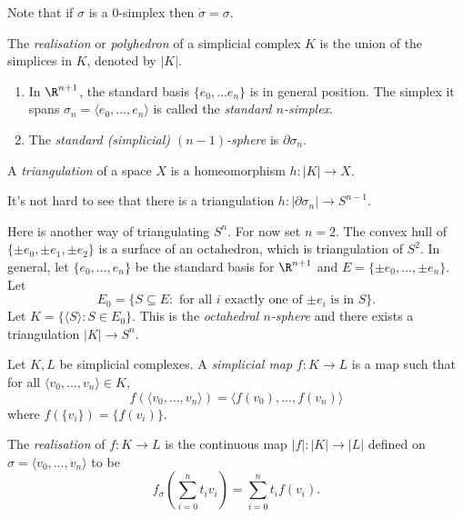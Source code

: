 \documentclass[a4paper]{article}
\renewcommand{\b}{\partial} %
\newcommand{\interior}{\mathring} %
\begin{document}
Note that if \(\sigma\) is a \(0\)-simplex then \(\interior \sigma = \sigma\).

\begin{definition}
  The \emph{realisation} or \emph{polyhedron} of a simplicial complex \(K\) is the union of the simplices in \(K\), denoted by \(|K|\).
\end{definition}

\begin{eg}\leavevmode
  \begin{enumerate}
  \item In \(\R^{n + 1}\), the standard basis \(\{e_0, \dots e_n\}\) is in general position. The simplex it spans \(\sigma_n = \langle e_0, \dots, e_n\rangle\) is called the \emph{standard \(n\)-simplex}.
  \item The \emph{standard (simplicial) \((n - 1)\)-sphere} is \(\b \sigma_n\).
  \end{enumerate}
\end{eg}

\begin{definition}[triangulation]
  A \emph{triangulation} of a space \(X\) is a homeomorphism \(h: |K| \to X\).
\end{definition}

It's not hard to see that there is a triangulation \(h: |\b \sigma_n| \to S^{n - 1}\).

\begin{eg}
  Here is another way of triangulating \(S^n\). For now set \(n = 2\). The convex hull of \(\{\pm e_0, \pm e_1, \pm e_2\}\) is a surface of an octahedron, which is triangulation of \(S^2\). In general, let \(\{e_0, \dots, e_n\}\) be the standard basis for \(\R^{n + 1}\) and \(E = \{\pm e_0, \dots, \pm e_n\}\). Let
  \[
    E_0 = \{S \subseteq E: \text{ for all \(i\) exactly one of \(\pm e_i\) is in } S\}.
  \]
  Let \(K = \{\langle S \rangle: S \in E_0\}\). This is the \emph{octahedral \(n\)-sphere} and there exists a triangulation \(|K| \to S^n\).
\end{eg}

\begin{definition}
  Let \(K, L\) be simplicial complexes. A \emph{simplicial map} \(f: K \to L\) is a map such that for all \(\langle v_0, \dots, v_n \rangle \in K\),
  \[
    f(\langle v_0, \dots, v_n \rangle) = \langle f(v_0), \dots, f(v_n) \rangle
  \]
  where \(f(\{v_i\}) = \{f(v_i)\}\).

  The \emph{realisation} of \(f: K \to L\) is the continuous map \(|f|: |K| \to |L|\) defined on \(\sigma = \langle v_0 , \dots, v_n \rangle\) to be
  \[
    f_\sigma \left( \sum_{i = 0}^n t_iv_i \right) = \sum_{i = 0}^n t_i f(v_i).
  \]
\end{definition}
\end{document}

